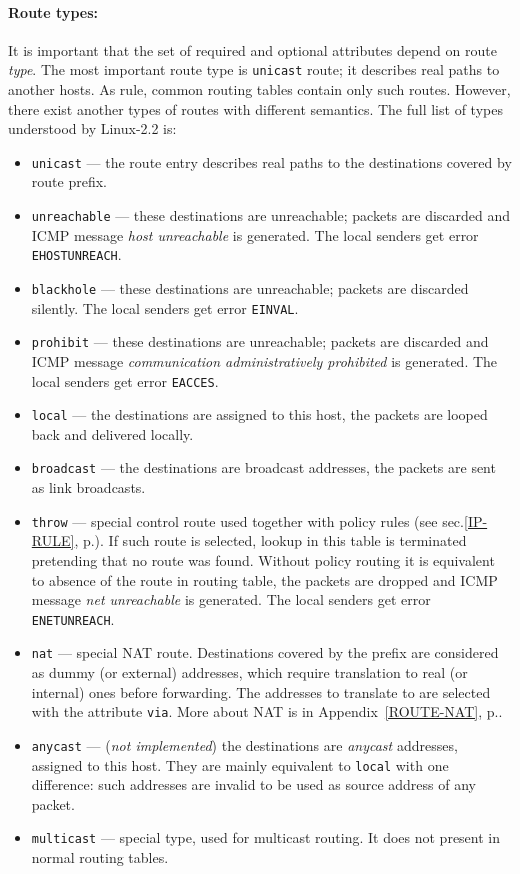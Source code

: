 \paragraph{Route types:} \label{IP-ROUTE-TYPES}
It is important that the set
of required and optional attributes depend on route {\em type\/}.
The most important route type
is \verb|unicast| route; it describes real paths to another hosts.
As rule, common routing tables contain only such routes. However,
there exist another types of routes with different semantics. The
full list of types understood by Linux-2.2 is:
\begin{itemize}
\item \verb|unicast| --- the route entry describes real paths to the
destinations covered by route prefix.
\item \verb|unreachable| --- these destinations are unreachable; packets
are discarded and ICMP message {\em host unreachable\/} is generated.
The local senders get error \verb|EHOSTUNREACH|.
\item \verb|blackhole| --- these destinations are unreachable; packets
are discarded silently. The local senders get error \verb|EINVAL|.
\item \verb|prohibit| --- these destinations are unreachable; packets
are discarded and ICMP message {\em communication administratively
prohibited\/} is generated. The local senders get error \verb|EACCES|.
\item \verb|local| --- the destinations are assigned to this
host, the packets are looped back and delivered locally.
\item \verb|broadcast| --- the destinations are broadcast addresses,
the packets are sent as link broadcasts.
\item \verb|throw| --- special control route used together with policy
rules (see sec.\ref{IP-RULE}, p.\pageref{IP-RULE}). If such route is selected, lookup
in this table is terminated pretending that no route was found.
Without policy routing it is equivalent to absence of the route in routing
table, the packets are dropped and ICMP message {\em net unreachable\/}
is generated. The local senders get error \verb|ENETUNREACH|.
\item \verb|nat| --- special NAT route. Destinations covered by the prefix
are considered as dummy (or external) addresses, which require translation
to real (or internal) ones before forwarding. The addresses to translate to
are selected with the attribute \verb|via|. More about NAT is
in Appendix~\ref{ROUTE-NAT}, p.\pageref{ROUTE-NAT}.
\item \verb|anycast| --- ({\em not implemented\/}) the destinations are
{\em anycast\/} addresses, assigned to this host. They are mainly equivalent
to \verb|local| with one difference: such addresses are invalid to be used
as source address of any packet.
\item \verb|multicast| --- special type, used for multicast routing.
It does not present in normal routing tables.
\end{itemize}

